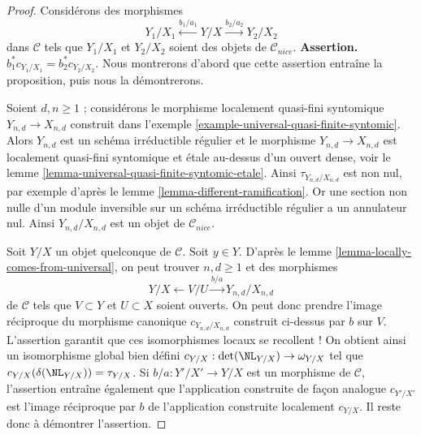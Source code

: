\begin{proof}
\medskip\noindent
Considérons des morphismes
$$
Y_1/X_1 \xleftarrow{b_1/a_1} Y/X \xrightarrow{b_2/a_2} Y_2/X_2
$$
dans $\mathcal{C}$ tels que $Y_1/X_1$ et $Y_2/X_2$ soient des objets
de $\mathcal{C}_{nice}$. {\bf Assertion.} $b_1^*c_{Y_1/X_1} = b_2^*c_{Y_2/X_2}$.
Nous montrerons d'abord que cette assertion entraîne la proposition,
puis nous la démontrerons.

\medskip\noindent
Soient $d, n \geq 1$ ; considérons le morphisme localement
quasi-fini syntomique $Y_{n, d} \to X_{n, d}$
construit dans l'exemple \ref{example-universal-quasi-finite-syntomic}.
Alors $Y_{n, d}$ est un schéma irréductible régulier et le
morphisme $Y_{n, d} \to X_{n, d}$ est localement quasi-fini syntomique
et étale au-dessus d'un ouvert dense, voir le
lemme \ref{lemma-universal-quasi-finite-syntomic-etale}.
Ainsi $\tau_{Y_{n, d}/X_{n, d}}$ est non nul, par exemple d'après le
lemme \ref{lemma-different-ramification}. Or une section non nulle
d'un module inversible sur un schéma irréductible régulier
a un annulateur nul. Ainsi
$Y_{n, d}/X_{n, d}$ est un objet de $\mathcal{C}_{nice}$.

\medskip\noindent
Soit $Y/X$ un objet quelconque de $\mathcal{C}$. Soit $y \in Y$.
D'après le lemme \ref{lemma-locally-comes-from-universal}, on peut trouver
$n, d \geq 1$ et des morphismes
$$
Y/X \leftarrow V/U \xrightarrow{b/a} Y_{n, d}/X_{n, d}
$$
de $\mathcal{C}$ tels que $V \subset Y$ et $U \subset X$ soient ouverts.
On peut donc prendre l'image réciproque du morphisme canonique $c_{Y_{n, d}/X_{n, d}}$
construit ci-dessus par $b$ sur $V$. L'assertion garantit que ces isomorphismes
locaux se recollent ! On obtient ainsi un isomorphisme global bien défini
$c_{Y/X} : \det(\NL_{Y/X}) \to \omega_{Y/X}$ tel que
$c_{Y/X}(\delta(\NL_{Y/X})) = \tau_{Y/X}$.
Si $b/a : Y'/X' \to Y/X$ est un morphisme de $\mathcal{C}$,
l'assertion entraîne également que l'application construite de façon analogue
$c_{Y'/X'}$ est l'image réciproque par $b$ de l'application construite localement
$c_{Y/X}$. Il reste donc à démontrer l'assertion.


\end{proof}
